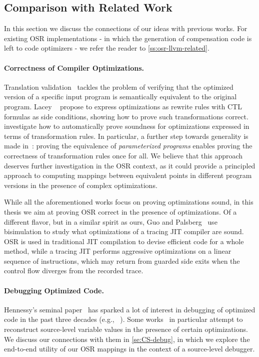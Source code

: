 
\subsection{Comparison with Related Work}
In this section we discuss the connections of our ideas with previous works. For existing OSR implementations - in which the generation of compensation code is left to code optimizers - we refer the reader to \mysection\ref{ss:osr-llvm-related}.

\paragraph*{Correctness of Compiler Optimizations.} Translation validation~\cite{Pnueli98, Necula00} tackles the problem of verifying that the optimized version of a specific input program is semantically equivalent to the original program. Lacey \etal~\cite{Lacey02, Lacey04} propose to express optimizations as rewrite rules with CTL formulas as side conditions, showing how to prove such transformations correct. \cite{Lerner03, Lerner05, Kundu09} investigate how to automatically prove soundness for optimizations expressed in terms of transformation rules. In particular, a further step towards generality is made in~\cite{Kundu09}: proving the equivalence of {\em parameterized programs} enables proving the correctness of transformation rules once for all. We believe that this approach deserves further investigation in the OSR context, as it could provide a principled approach to computing mappings between equivalent points in different program versions in the presence of complex optimizations. 

While all the aforementioned works focus on proving optimizations sound, in this thesis we aim at proving OSR correct in the presence of optimizations. Of a different flavor, but in a similar spirit as ours, Guo and Palsberg~\cite{Guo11} use bisimulation to study what optimizations of a tracing JIT compiler are sound. OSR is used in traditional JIT compilation to devise efficient code for a whole method, while a tracing JIT performs aggressive optimizations on a linear sequence of instructions, which may return from guarded side exits when the control flow diverges from the recorded trace.

\paragraph*{Debugging Optimized Code.} Hennessy's seminal paper~\cite{Hennessy82} has sparked a lot of interest in debugging of optimized code in the past three decades (e.g., ~\cite{Coutant88, Adl-Tabatabai96, Wu99, Jaramillo00, Barr14}). Some works~\cite{Hennessy82, Wu99} in particular attempt to reconstruct source-level variable values in the presence of certain optimizations. We discuss our connections with them in \mysection\ref{se:CS-debug}, in which we explore the end-to-end utility of our OSR mappings in the context of a source-level debugger.

